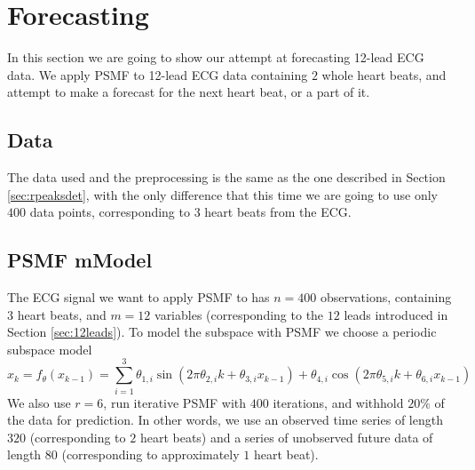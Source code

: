 \documentclass{mldsmsc}
\begin{document}
\section{Forecasting}

In this section we are going to show our attempt at forecasting 12-lead ECG data. We apply PSMF to 12-lead ECG data containing $2$ whole heart beats, and attempt to make a forecast for the next heart beat, or a part of it.

\subsection{Data}

The data used and the preprocessing is the same as the one described in Section \ref{sec:rpeaksdet}, with the only difference that this time we are going to use only $400$ data points, corresponding to $3$ heart beats from the ECG.

\subsection{PSMF mModel}

The ECG signal we want to apply PSMF to has $n = 400$ observations, containing $3$ heart beats, and $m = 12$ variables (corresponding to the $12$ leads introduced in Section \ref{sec:12leads}). To model the subspace with PSMF we choose a periodic subspace model
\begin{equation}
    x_k = f_{\theta}(x_{k-1}) = \sum_{i=1}^3 \theta_{1,i} \sin(2\pi \theta_{2,i} k + \theta_{3,i} x_{k-1}) + \theta_{4,i} \cos(2\pi \theta_{5,i} k + \theta_{6,i} x_{k-1})
\end{equation}
We also use $r = 6$, run iterative PSMF with $400$ iterations, and withhold $20\%$ of the data for prediction. In other words, we use an observed time series of length $320$ (corresponding to $2$ heart beats) and a series of unobserved future data of length $80$ (corresponding to approximately $1$ heart beat). \newline
\end{document}
